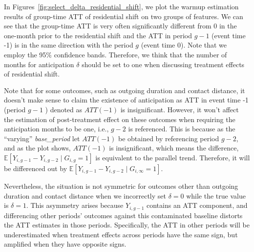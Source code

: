 In Figures~\ref{fig:select_delta_residential_shift}, we plot the warmup estimation results of group-time ATT of residential shift on two groups of features.
We can see that the group-time ATT is very often significantly different from 0 in the one-month prior to the residential shift and the ATT in period \( g-1 \) (event time -1) is in the same direction with the period \( g \) (event time 0).
Note that we employ the 95\% confidence bands.
Therefore, we think that the number of months for anticipation \( \delta \)	 should be set to one when discussing treatment effects of residential shift.

Note that for some outcomes, such as outgoing duration and contact distance, it doesn't make sense to claim the existence of anticipation as ATT in event time -1 (period \( g-1 \)	) denoted as \( ATT(-1) \) is insignificant.
However, it won't affect the estimation of post-treatment effect on these outcomes when requiring the anticipation months to be one, i.e., \( g-2 \) is referenced.
This is because as the ``varying'' \textit{base\_period} let $ATT(-1)$ be obtained by referencing period $g-2$, and as the plot shows, $ATT(-1)$ is insignificant, which means the difference, $\mathbb{E}[Y_{i, g-1} - Y_{i, g-2} \mid G_{i, g} = 1]$ is equivalent to the parallel trend. Therefore, it will be differenced out by $\mathbb{E}[Y_{i, g-1} - Y_{i, g-2} \mid G_{i, \infty} = 1]$.

Nevertheless, the situation is not symmetric for outcomes other than outgoing duration and contact distance when we incorrectly set \( \delta = 0 \) while the true value is \( \delta = 1 \).
This asymmetry arises because \( Y_{i,g-1} \) contains an ATT component, and differencing other periods' outcomes against this contaminated baseline distorts the ATT estimates in those periods.
Specifically, the ATT in other periods will be underestimated when treatment effects across periods have the same sign, but amplified when they have opposite signs.

